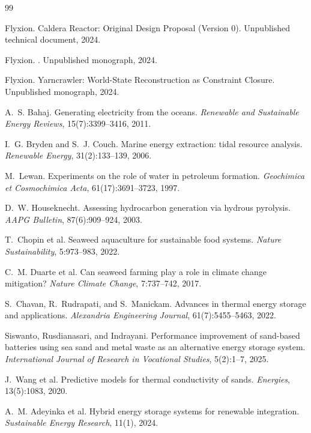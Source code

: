 \documentclass[12pt, a4paper]{article}
\begin{document}
\begin{thebibliography}{99}

Flyxion.
\newblock Caldera Reactor: Original Design Proposal (Version 0).
\newblock Unpublished technical document, 2024.

Flyxion.
.
\newblock Unpublished monograph, 2024.

Flyxion.
\newblock Yarncrawler: World-State Reconstruction as Constraint Closure.
\newblock Unpublished monograph, 2024.

A.~S. Bahaj.
\newblock Generating electricity from the oceans.
\newblock \emph{Renewable and Sustainable Energy Reviews}, 15(7):3399--3416, 2011.

I.~G. Bryden and S.~J. Couch.
\newblock Marine energy extraction: tidal resource analysis.
\newblock \emph{Renewable Energy}, 31(2):133--139, 2006.

M.~Lewan.
\newblock Experiments on the role of water in petroleum formation.
\newblock \emph{Geochimica et Cosmochimica Acta}, 61(17):3691--3723, 1997.

D.~W. Houseknecht.
\newblock Assessing hydrocarbon generation via hydrous pyrolysis.
\newblock \emph{AAPG Bulletin}, 87(6):909--924, 2003.

T.~Chopin et al.
\newblock Seaweed aquaculture for sustainable food systems.
\newblock \emph{Nature Sustainability}, 5:973--983, 2022.

C.~M. Duarte et al.
\newblock Can seaweed farming play a role in climate change mitigation?
\newblock \emph{Nature Climate Change}, 7:737--742, 2017.

S.~Chavan, R.~Rudrapati, and S.~Manickam.
\newblock Advances in thermal energy storage and applications.
\newblock \emph{Alexandria Engineering Journal}, 61(7):5455--5463, 2022.

Siswanto, Rusdianasari, and Indrayani.
\newblock Performance improvement of sand-based batteries using sea sand and metal waste as an alternative energy storage system.
\newblock \emph{International Journal of Research in Vocational Studies}, 5(2):1--7, 2025.

J.~Wang et al.
\newblock Predictive models for thermal conductivity of sands.
\newblock \emph{Energies}, 13(5):1083, 2020.

A.~M. Adeyinka et al.
\newblock Hybrid energy storage systems for renewable integration.
\newblock \emph{Sustainable Energy Research}, 11(1), 2024.

\end{thebibliography}
\end{document}
